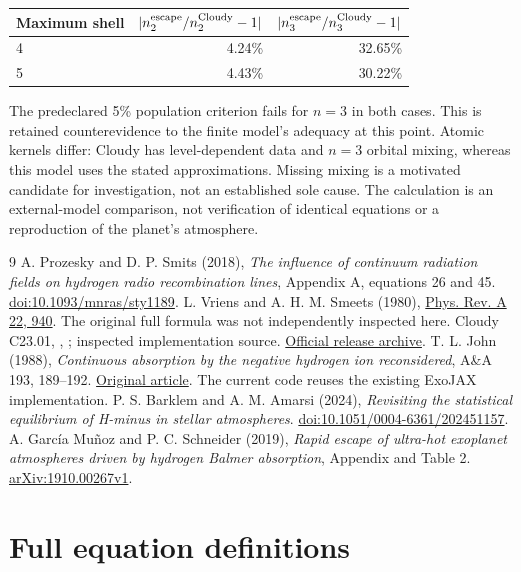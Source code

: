 \documentclass[11pt,a4paper]{article}
\begin{document}
\begin{center}
\begin{tabular}{@{}lrr@{}}
\toprule
Maximum shell & $|n_2^{\rm escape}/n_2^{\rm Cloudy}-1|$
 & $|n_3^{\rm escape}/n_3^{\rm Cloudy}-1|$\\
\midrule
4 & 4.24\% & 32.65\%\\
5 & 4.43\% & 30.22\%\\
\bottomrule
\end{tabular}
\end{center}
The predeclared 5\% population criterion fails for $n=3$ in both cases.
This is retained counterevidence to the finite model's adequacy at this point.
Atomic kernels differ: Cloudy has level-dependent data and $n=3$ orbital mixing,
whereas this model uses the stated approximations. Missing mixing is a motivated
candidate for investigation, not an established sole cause. The calculation is
an external-model comparison, not verification of identical equations or a
reproduction of the planet's atmosphere.

\begin{thebibliography}{9}
 A. Prozesky and D. P. Smits (2018),
\emph{The influence of continuum radiation fields on hydrogen radio
recombination lines}, Appendix A, equations 26 and 45.
\href{https://doi.org/10.1093/mnras/sty1189}{doi:10.1093/mnras/sty1189}.
 L. Vriens and A. H. M. Smeets (1980),
\href{https://doi.org/10.1103/PhysRevA.22.940}{Phys. Rev. A 22, 940}.
The original full formula was not independently inspected here.
 Cloudy C23.01, ,
; inspected implementation source.
\href{https://data.nublado.org/cloudy_releases/c23/c23.01.tar.gz}{Official release archive}.
 T. L. John (1988), \emph{Continuous absorption by the negative
hydrogen ion reconsidered}, A\&A 193, 189--192.
\href{https://articles.adsabs.harvard.edu/pdf/1988A%26A...193..189J}{Original article}.
The current code reuses the existing ExoJAX implementation.
 P. S. Barklem and A. M. Amarsi (2024),
\emph{Revisiting the statistical equilibrium of H-minus in stellar atmospheres}.
\href{https://doi.org/10.1051/0004-6361/202451157}{doi:10.1051/0004-6361/202451157}.
 A. Garc\'ia Mu\~noz and P. C. Schneider (2019),
\emph{Rapid escape of ultra-hot exoplanet atmospheres driven by hydrogen
Balmer absorption}, Appendix and Table 2.
\href{https://arxiv.org/abs/1910.00267v1}{arXiv:1910.00267v1}.
\end{thebibliography}

\appendix
\section{Full equation definitions}

\end{document}

